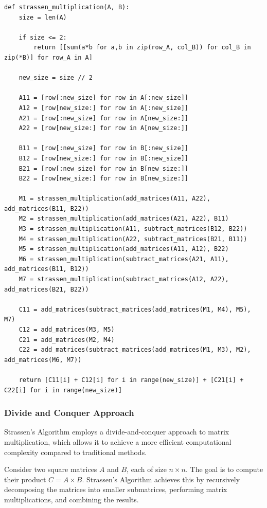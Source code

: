 \documentclass[12pt]{book} %
\begin{document}
\begin{lstlisting}
def strassen_multiplication(A, B):
    size = len(A)

    if size <= 2:
        return [[sum(a*b for a,b in zip(row_A, col_B)) for col_B in zip(*B)] for row_A in A]

    new_size = size // 2

    A11 = [row[:new_size] for row in A[:new_size]]
    A12 = [row[new_size:] for row in A[:new_size]]
    A21 = [row[:new_size] for row in A[new_size:]]
    A22 = [row[new_size:] for row in A[new_size:]]

    B11 = [row[:new_size] for row in B[:new_size]]
    B12 = [row[new_size:] for row in B[:new_size]]
    B21 = [row[:new_size] for row in B[new_size:]]
    B22 = [row[new_size:] for row in B[new_size:]]

    M1 = strassen_multiplication(add_matrices(A11, A22), add_matrices(B11, B22))
    M2 = strassen_multiplication(add_matrices(A21, A22), B11)
    M3 = strassen_multiplication(A11, subtract_matrices(B12, B22))
    M4 = strassen_multiplication(A22, subtract_matrices(B21, B11))
    M5 = strassen_multiplication(add_matrices(A11, A12), B22)
    M6 = strassen_multiplication(subtract_matrices(A21, A11), add_matrices(B11, B12))
    M7 = strassen_multiplication(subtract_matrices(A12, A22), add_matrices(B21, B22))

    C11 = add_matrices(subtract_matrices(add_matrices(M1, M4), M5), M7)
    C12 = add_matrices(M3, M5)
    C21 = add_matrices(M2, M4)
    C22 = add_matrices(subtract_matrices(add_matrices(M1, M3), M2), add_matrices(M6, M7))

    return [C11[i] + C12[i] for i in range(new_size)] + [C21[i] + C22[i] for i in range(new_size)]

\end{lstlisting}

\subsubsection{Divide and Conquer Approach}
Strassen's Algorithm employs a divide-and-conquer approach to matrix multiplication, which allows it to achieve a more efficient computational complexity compared to traditional methods.

Consider two square matrices $A$ and $B$, each of size $n \times n$. The goal is to compute their product $C = A \times B$. Strassen's Algorithm achieves this by recursively decomposing the matrices into smaller submatrices, performing matrix multiplications, and combining the results.
\end{document}
